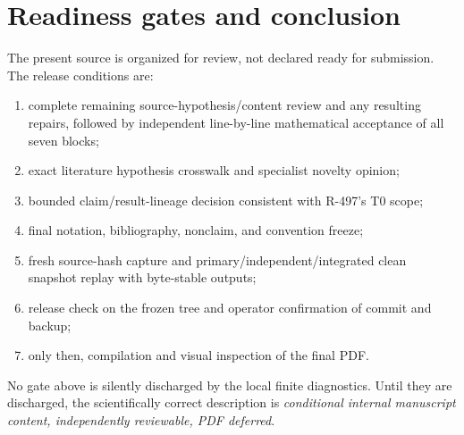 \documentclass[11pt]{article}
\numberwithin{equation}{section}
\theoremstyle{definition}
\begin{document}
\section{Readiness gates and conclusion}
\label{sec:readiness}

The present source is organized for review, not declared ready for submission.
The release conditions are:
\begin{enumerate}[label=\textup{(G\arabic*)},leftmargin=2.3em]
\item complete remaining source-hypothesis/content review and any resulting repairs, followed by independent
      line-by-line mathematical acceptance of all seven blocks;
\item exact literature hypothesis crosswalk and specialist novelty opinion;
\item bounded claim/result-lineage decision consistent with R-497's T0 scope;
\item final notation, bibliography, nonclaim, and convention freeze;
\item fresh source-hash capture and primary/independent/integrated clean
      snapshot replay with byte-stable outputs;
\item release check on the frozen tree and operator confirmation of commit and
      backup;
\item only then, compilation and visual inspection of the final PDF.
\end{enumerate}
No gate above is silently discharged by the local finite diagnostics.  Until
they are discharged, the scientifically correct description is
\textit{conditional internal manuscript content, independently reviewable,
PDF deferred}.
\end{document}
